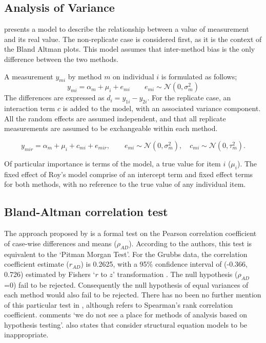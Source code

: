 \documentclass[12pt, a4paper]{report}
\theoremstyle{plain}
\theoremstyle{definition}
\theoremstyle{remark}
\begin{document}
\subsection{Analysis of Variance }

\citet{BXC2004} presents a model to describe the relationship between a value of measurement and its
real value. The non-replicate case is considered first, as it is the context of the Bland Altman plots. This model assumes that inter-method bias is the only difference between the two methods.

A measurement $y_{mi}$ by method $m$ on individual $i$ is formulated as follows;
\begin{equation}
y_{mi}  = \alpha_{m} + \mu_{i} + e_{mi} \qquad  e_{mi} \sim
\mathcal{N}(0,\sigma^{2}_{m})
\end{equation}
The differences are expressed as $d_{i} = y_{1i} - y_{2i}$. For the replicate case, an interaction term $c$ is added to the model, with an associated variance component. All the random effects are assumed independent, and that all replicate measurements are assumed to be exchangeable within each method.

\begin{equation}
y_{mir}  = \alpha_{m} + \mu_{i} + c_{mi} + e_{mir}, \qquad  e_{mi}
\sim \mathcal{N}(0,\sigma^{2}_{m}), \quad c_{mi} \sim \mathcal{N}(0,\tau^{2}_{m}).
\end{equation}

Of particular importance is terms of the model, a true value for item $i$ ($\mu_{i}$).  The fixed effect of Roy's model comprise of an intercept term and fixed effect terms for both methods, with no reference to the true value of any individual item. 



\subsection{Bland-Altman correlation test}

The approach proposed by \citet{BA83} is a formal test on the
Pearson correlation coefficient of case-wise differences and means
($\rho_{AD}$). According to the authors, this test is equivalent
to the `Pitman Morgan Test'. For the Grubbs data, the correlation
coefficient estimate ($r_{AD}$) is 0.2625, with a 95\% confidence
interval of (-0.366, 0.726) estimated by Fishers `$r$ to $z$'
transformation \citep*{Cohen}. The null hypothesis ($\rho_{AD}$ =0)
fail to be rejected. Consequently the null hypothesis of equal
variances of each method would also fail to be rejected. There has
no been no further mention of this particular test in
\citet{BA86}, although \citet{BA99} refers to Spearman's rank
correlation coefficient. \citet{BA99} comments `we do not see a
place for methods of analysis based on hypothesis testing'.
\citet{BA99} also states that consider structural equation models
to be inappropriate.
\end{document}
